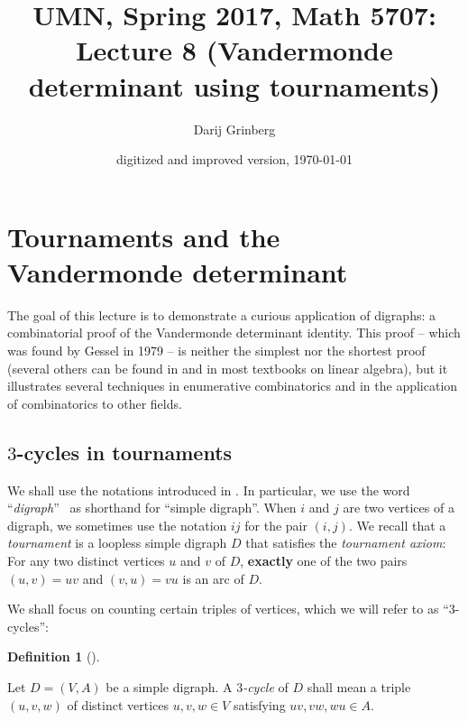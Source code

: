 \documentclass[numbers=enddot,12pt,final,onecolumn,notitlepage]{scrartcl}%
\numberwithin{exer}{subsection}
\theoremstyle{definition}
\newtheorem{defi}[theo]{Definition}
\newenvironment{definition}[1][]
{\begin{defi}[#1]\begin{leftbar}}
{\end{leftbar}\end{defi}}
\begin{document}
\title{UMN, Spring 2017, Math 5707: Lecture 8 (Vandermonde determinant using tournaments)}
\author{Darij Grinberg}
\date{digitized and improved version,
\today
}
\maketitle
\tableofcontents

\section{Tournaments and the Vandermonde determinant}

The goal of this lecture is to demonstrate a curious application of digraphs:
a combinatorial proof of the Vandermonde determinant identity. This proof --
which was found by Gessel in 1979 -- is neither the simplest nor the shortest
proof (several others can be found in \cite[\S 6.7]{detnotes} and in most
textbooks on linear algebra), but it illustrates several techniques in
enumerative combinatorics and in the application of combinatorics to other fields.

\subsection{$3$-cycles in tournaments}

We shall use the notations introduced in \cite[\S 1.1 and \S 1.4]{lec7}. In
particular, we use the word \textquotedblleft\emph{digraph}\textquotedblright%
\ as shorthand for \textquotedblleft simple digraph\textquotedblright. When
$i$ and $j$ are two vertices of a digraph, we sometimes use the notation $ij$
for the pair $\left(  i,j\right)  $. We recall that a \emph{tournament} is a
loopless simple digraph $D$ that satisfies the \emph{tournament axiom}: For
any two distinct vertices $u$ and $v$ of $D$, \textbf{exactly} one of the two
pairs $\left(  u,v\right)  =uv$ and $\left(  v,u\right)  =vu$ is an arc of $D$.

We shall focus on counting certain triples of vertices, which we will refer to
as \textquotedblleft$3$-cycles\textquotedblright:

\begin{definition}
Let $D=\left(  V,A\right)  $ be a simple digraph. A $3$\emph{-cycle} of $D$
shall mean a triple $\left(  u,v,w\right)  $ of distinct vertices $u,v,w\in V$
satisfying $uv,vw,wu\in A$.
\end{definition}
\end{document}

